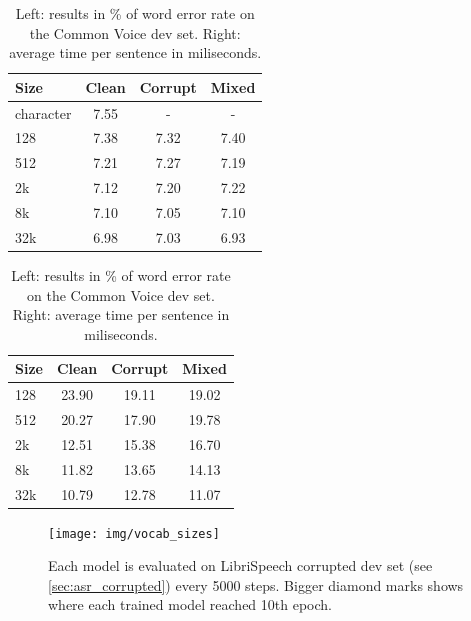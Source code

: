 \begin{table}[h]
\begin{minipage}[h]{.50\textwidth}
   \centering
	\begin{tabular}{l|ccc}
		\bf Size & \bf Clean & \bf Corrupt & \bf Mixed \\
		\hline
            character &  7.55  &  -  &  -  \\
            128 & 7.38   &  7.32  & 7.40  \\
            512 &  7.21  & 7.27   & 7.19  \\
            2k & 7.12   & 7.20 & 7.22  \\
            8k &  7.10  & 7.05  & 7.10  \\
            32k &  6.98  & 7.03  &  6.93 \\

	\end{tabular}
\end{minipage}
\begin{minipage}[h]{.49\textwidth}
   \centering
	\begin{tabular}{l|ccc}
		\bf Size & \bf Clean & \bf Corrupt & \bf Mixed \\
		\hline
           128 & 23.90   & 19.11   & 19.02  \\
            512 &  20.27   &   17.90  & 19.78  \\
            2k &  12.51  &  15.38 & 16.70  \\
            8k &  11.82  &  13.65  & 14.13  \\
            32k & 10.79   &  12.78 & 11.07  \\
	\end{tabular}
\end{minipage}
	\caption{Left: results in \% of word error rate on the Common Voice dev set. Right: average time per sentence in miliseconds.}
	\label{tab:results_vocabularies_common}
\end{table}

\begin{figure}[h]
	\texttt{[image: img/vocab\_sizes]}
	\caption{Each model is evaluated on LibriSpeech corrupted dev set (see \cref{sec:asr_corrupted}) every 5000 steps. Bigger diamond marks shows where each trained model reached 10th epoch.}
	\label{fig:vocab_sizes}
\end{figure}


